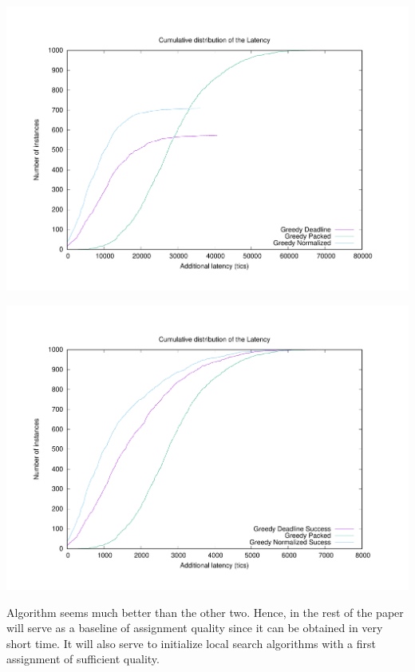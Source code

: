 \documentclass[english]{article}
\begin{document}
 	\begin{minipage}[c]{.45\linewidth}
	\centering
	\includegraphics[scale=0.23]{90load}
\label{fig:90load}
\end{minipage}
\begin{minipage}[c]{.45\linewidth}
	\centering
	\includegraphics[scale=0.23]{greedysuccess}
\label{fig:greedysuccess}
\end{minipage}

Algorithm \hybridgreedynormalized seems much better than the other two. Hence, in the rest of the paper \hybridgreedynormalized will serve 
as a baseline of assignment quality since it can be obtained in very short time. It will also serve to initialize 
local search algorithms with a first assignment of sufficient quality.
\end{document}
